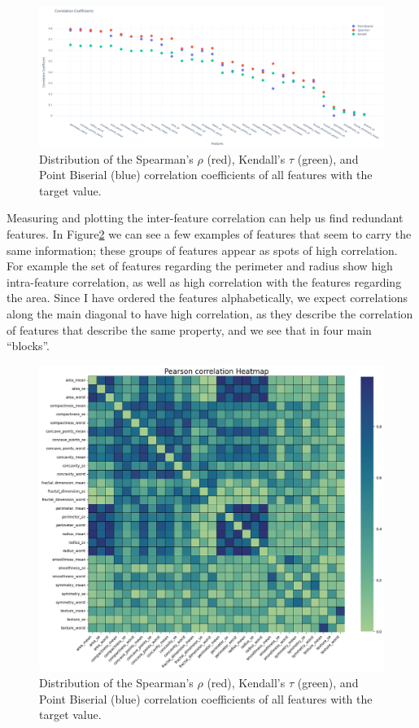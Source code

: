 \documentclass[12pt]{article}
\begin{document}
\begin{figure}[H]
    \centering
    \includegraphics[width=\textwidth]{ims/corr_coeffs.png}
    \caption{Distribution of the Spearman's $\rho$ (red), Kendall's $\tau$
    (green), and Point Biserial (blue) correlation coefficients of all features
    with the target value.}
    \label{fig:corr_coeffs}
\end{figure}

Measuring and plotting the inter-feature correlation can help us find redundant
features. In Figure\ref{fig:corr_coeffs_heatmap} we can see a few examples of
features that seem to carry the same information; these groups of features
appear as spots of high correlation. For example the set of features regarding
the perimeter and radius show high intra-feature correlation, as well as high
correlation with the features regarding the area. Since I have ordered the
features alphabetically, we expect correlations along the main diagonal to
have high correlation, as they describe the correlation of features that
describe the same property, and we see that in four main ``blocks''.

\begin{figure}[H]
    \centering
    \includegraphics[width=\textwidth]{ims/corr_coeffs_heatmap.png}
    \caption{Distribution of the Spearman's $\rho$ (red), Kendall's $\tau$
    (green), and Point Biserial (blue) correlation coefficients of all features
    with the target value.}
    \label{fig:corr_coeffs_heatmap}
\end{figure}
\end{document}
